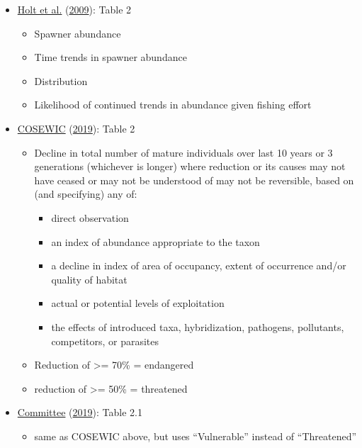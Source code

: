 \documentclass[11pt]{book}
\begin{document}
\begin{itemize}

\item
  \protect\hyperlink{ref-holt_indicators_2009}{Holt et al.} (\protect\hyperlink{ref-holt_indicators_2009}{2009}): Table 2
  \begin{itemize}

  \item
    Spawner abundance
  \item
    Time trends in spawner abundance
  \item
    Distribution
  \item
    Likelihood of continued trends in abundance given fishing effort
  \end{itemize}
\item
  \protect\hyperlink{ref-cosewic_cosewic_2019}{COSEWIC} (\protect\hyperlink{ref-cosewic_cosewic_2019}{2019}): Table 2
  \begin{itemize}

  \item
    Decline in total number of mature individuals over last 10 years or 3 generations (whichever is longer) where reduction or its causes may not have ceased or may not be understood of may not be reversible, based on (and specifying) any of:
    \begin{itemize}

    \item
      direct observation
    \item
      an index of abundance appropriate to the taxon
    \item
      a decline in index of area of occupancy, extent of occurrence and/or quality of habitat
    \item
      actual or potential levels of exploitation
    \item
      the effects of introduced taxa, hybridization, pathogens, pollutants, competitors, or parasites
    \end{itemize}
  \item
    Reduction of \textgreater= 70\% = endangered
  \item
    reduction of \textgreater= 50\% = threatened
  \end{itemize}
\item
  \protect\hyperlink{ref-iucn_standards_and_petitions_committee_guidelines_2019}{Committee} (\protect\hyperlink{ref-iucn_standards_and_petitions_committee_guidelines_2019}{2019}): Table 2.1
  \begin{itemize}

  \item
    same as COSEWIC above, but uses ``Vulnerable'' instead of ``Threatened''
  \end{itemize}
\end{itemize}
\end{document}
